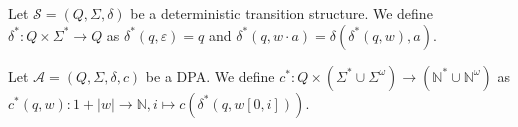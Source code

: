 \begin{defn}
	Let $\mathcal{S} = (Q, \Sigma, \delta)$ be a deterministic transition structure. We define $\delta^* : Q \times \Sigma^* \rightarrow Q$ as $\delta^*(q, \varepsilon) = q$ and $\delta^*(q, w \cdot a) = \delta(\delta^*(q, w), a)$.
\end{defn}

\begin{defn}
	Let $\mathcal{A} = (Q, \Sigma, \delta, c)$ be a DPA. We define $c^* : Q \times (\Sigma^* \cup \Sigma^\omega) \rightarrow (\mathbb{N}^* \cup \mathbb{N}^\omega)$ as $c^*(q, w) : 1+|w| \rightarrow \mathbb{N}, i \mapsto c(\delta^*(q, w[0, i]))$.
\end{defn}

